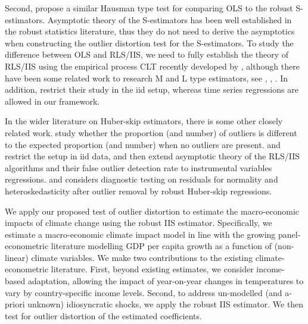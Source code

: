 \documentclass[11pt, letterpaper]{article}
\numberwithin{algorithm}{section}
\numberwithin{assumption}{section}
\numberwithin{lemma}{section}
\numberwithin{theorem}{section}
\numberwithin{corollary}{section}
\numberwithin{remark}{section}
\numberwithin{equation}{section}
\numberwithin{figure}{section}
\numberwithin{table}{section}
\begin{document}
Second, \cite{dehon2012extending} propose a similar Hausman type test for comparing OLS to the robust S-estimators. Asymptotic theory of the S-estimators has been well established in the robust statistics literature, thus they do not need to derive the asymptotics when constructing the outlier distortion test for the S-estimators. To study the difference between OLS and RLS/IIS, we need to fully establish the theory of RLS/IIS using the empirical process CLT recently developed by \cite{berenguer2019analysis}, although there have been some related work to research M and L type estimators, see \cite{hendry2008automatic}, \cite{johansen2009analysis, johansen2013outlier, johansen2016analysis, johansen2016asymptotic, johansen2019boundedness}, \cite{jiao2015asymptotic}. In addition, \cite{dehon2012extending} restrict their study in the iid setup, whereas time series regressions are allowed in our framework.

In the wider literature on Huber-skip estimators, there is some other closely related work. \cite{jiao2018testing} study whether the proportion (and number) of outliers is different to the expected proportion (and number) when no outliers are present. \cite{jiao2019robustIV} and \cite{jiao2021asymptoitcFODR2SLS} restrict the setup in iid data, and then extend asymptotic theory of the RLS/IIS algorithms and their false outlier detection rate to instrumental variables regressions. \cite{berenguer2018marked} and \cite{berenguer2021heteroscedasticity} considers diagnostic testing on residuals for normality and heteroskedasticity after outlier removal by robust Huber-skip regressions.

We apply our proposed test of outlier distortion to estimate the macro-economic impacts of climate change using the robust IIS estimator. Specifically, we estimate a macro-economic climate impact model in line with the growing panel-econometric literature modelling GDP per capita growth as a function of (non-linear) climate variables. We make two contributions to the existing climate-econometric literature. First, beyond existing estimates, we consider income-based adaptation, allowing the impact of year-on-year changes in temperatures to vary by country-specific income levels. Second, to address un-modelled (and a-priori unknown) idiosyncratic shocks, we apply the robust IIS estimator. We then test for outlier distortion of the estimated coefficients.
\end{document}
